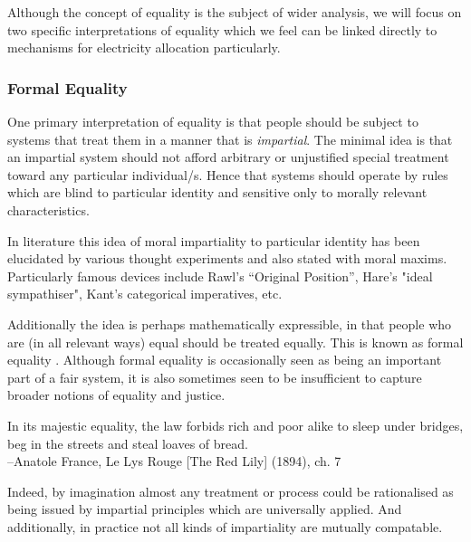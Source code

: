 Although the concept of equality is the subject of wider analysis, we will focus on two specific interpretations of equality which we feel can be linked directly to mechanisms for electricity allocation particularly.

\subsubsection{Formal Equality}

One primary interpretation of equality is that people should be subject to systems that treat them in a manner that is \textit{impartial}. The minimal idea is that an impartial system should not afford arbitrary or unjustified special treatment toward any particular individual/s. Hence that systems should operate by rules which are blind to particular identity and sensitive only to morally relevant characteristics.

In literature this idea of moral impartiality to particular identity has been elucidated by various thought experiments and also stated with moral maxims.
Particularly famous devices include Rawl's ``Original Position'', Hare's "ideal sympathiser", Kant's categorical imperatives, etc.

Additionally the idea is perhaps mathematically expressible, in that people who are (in all relevant ways) equal should be treated equally.
This is known as formal equality \cite{whatisbasicequalitynathan}. Although formal equality is occasionally seen as being an important part of a fair system, it is also sometimes seen to be insufficient to capture broader notions of equality and justice.

\begin{displayquote}
In its majestic equality, the law forbids rich and poor alike to sleep under bridges, beg in the streets and steal loaves of bread.\\
--Anatole France, Le Lys Rouge [The Red Lily] (1894), ch. 7
\end{displayquote}

Indeed, by imagination almost any treatment or process could be rationalised as being issued by impartial principles which are universally applied. And additionally, in practice not all kinds of impartiality are mutually compatable.\cite{Hutchinson_2019}

